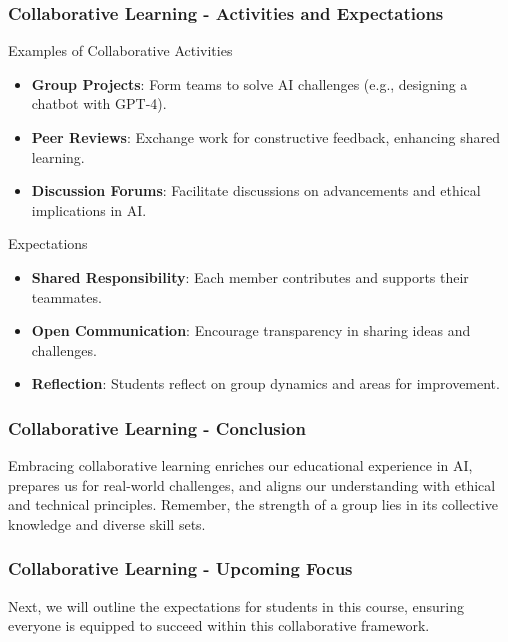 \documentclass[aspectratio=169]{beamer}
\begin{document}
\begin{frame}[fragile]
    \frametitle{Collaborative Learning - Activities and Expectations}
    \begin{block}{Examples of Collaborative Activities}
        \begin{itemize}
            \item \textbf{Group Projects}: 
                Form teams to solve AI challenges (e.g., designing a chatbot with GPT-4).
                
            \item \textbf{Peer Reviews}: 
                Exchange work for constructive feedback, enhancing shared learning.
                
            \item \textbf{Discussion Forums}: 
                Facilitate discussions on advancements and ethical implications in AI.
        \end{itemize}
    \end{block}
    
    \begin{block}{Expectations}
        \begin{itemize}
            \item \textbf{Shared Responsibility}: Each member contributes and supports their teammates.
            \item \textbf{Open Communication}: Encourage transparency in sharing ideas and challenges. 
            \item \textbf{Reflection}: Students reflect on group dynamics and areas for improvement.
        \end{itemize}
    \end{block}
\end{frame}

\begin{frame}[fragile]
    \frametitle{Collaborative Learning - Conclusion}
    Embracing collaborative learning enriches our educational experience in AI, prepares us for real-world challenges, and aligns our understanding with ethical and technical principles. 
    Remember, the strength of a group lies in its collective knowledge and diverse skill sets.
\end{frame}

\begin{frame}[fragile]
    \frametitle{Collaborative Learning - Upcoming Focus}
    Next, we will outline the expectations for students in this course, ensuring everyone is equipped to succeed within this collaborative framework.
\end{frame}
\end{document}
